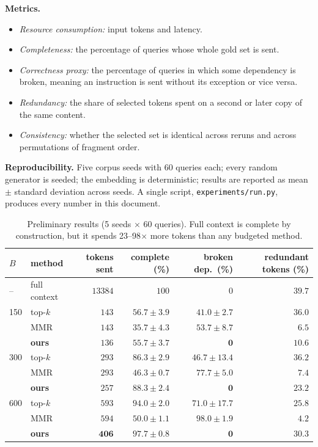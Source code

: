 \documentclass[10pt,a4paper]{article}
\begin{document}
\textbf{Metrics.}
\begin{itemize}
\item \emph{Resource consumption:} input tokens and latency.
\item \emph{Completeness:} the percentage of queries whose whole gold set is sent.
\item \emph{Correctness proxy:} the percentage of queries in which some dependency is broken, meaning an instruction is sent without its exception or vice versa.
\item \emph{Redundancy:} the share of selected tokens spent on a second or later copy of the same content.
\item \emph{Consistency:} whether the selected set is identical across reruns and across permutations of fragment order.
\end{itemize}

\textbf{Reproducibility.} Five corpus seeds with 60 queries each; every random generator is seeded; the embedding is deterministic; results are reported as mean $\pm$ standard deviation across seeds. A single script, \texttt{experiments/run.py}, produces every number in this document.

\begin{table}[h]\centering\small
\begin{tabular}{@{}llrrrr@{}}
\toprule
$B$ & method & tokens sent & complete (\%) & broken dep.\ (\%) & redundant tokens (\%)\\
\midrule
--  & full context & $13384$ & $100$ & $0$ & $39.7$\\
\midrule
150 & top-$k$ & $143$ & $56.7\pm3.9$ & $41.0\pm2.7$ & $36.0$\\
    & MMR     & $143$ & $35.7\pm4.3$ & $53.7\pm8.7$ & $6.5$\\
    & \textbf{ours} & $136$ & $55.7\pm3.7$ & $\mathbf{0}$ & $10.6$\\
\midrule
300 & top-$k$ & $293$ & $86.3\pm2.9$ & $46.7\pm13.4$ & $36.2$\\
    & MMR     & $293$ & $46.3\pm0.7$ & $77.7\pm5.0$ & $7.4$\\
    & \textbf{ours} & $257$ & $\mathbf{88.3\pm2.4}$ & $\mathbf{0}$ & $23.2$\\
\midrule
600 & top-$k$ & $593$ & $94.0\pm2.0$ & $71.0\pm17.7$ & $25.8$\\
    & MMR     & $594$ & $50.0\pm1.1$ & $98.0\pm1.9$ & $4.2$\\
    & \textbf{ours} & $\mathbf{406}$ & $\mathbf{97.7\pm0.8}$ & $\mathbf{0}$ & $30.3$\\
\bottomrule
\end{tabular}
\caption{Preliminary results (5 seeds $\times$ 60 queries). Full context is complete by construction, but it spends 23--98$\times$ more tokens than any budgeted method.}\label{tab}
\end{table}
\end{document}
